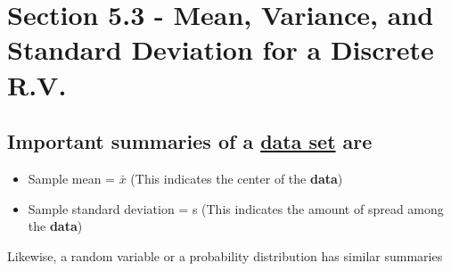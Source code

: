\documentclass{report}
\begin{document}
   \section*{Section 5.3 - Mean, Variance, and Standard Deviation for a Discrete R.V.} 
   \bigbreak \noindent 
   \subsection*{Important summaries of a \underline{data set} are}
   \bigbreak \noindent
   \begin{itemize}[label=$\circ$]
     \item Sample mean = $\bar{x}$ \hspace{28mm} (This indicates the center of the \textbf{data})
     \item Sample standard deviation = s \hspace{8mm} (This indicates the amount of spread among the \textbf{data})
   \end{itemize}
  \bigbreak \noindent
  Likewise, a random variable or a probability distribution has similar summaries
  \bigbreak \noindent
\end{document}
